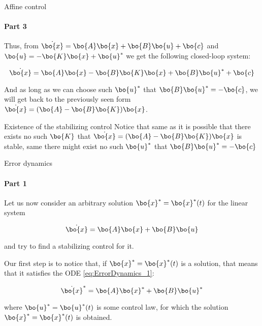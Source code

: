 \documentclass{beamer}
\begin{document}
\begin{frame}{Affine control}
\framesubtitle{Part 3}
\begin{flushleft}

Thus, from $\dot{\bo{x}} = \bo{A}\bo{x} + \bo{B}\bo{u} + \bo{c}$ and $\bo{u} = -\bo{K}\bo{x} + \bo{u}^*$ we get the following closed-loop system:

\begin{equation}
    \dot{\bo{x}} = \bo{A}\bo{x} - \bo{B}\bo{K}\bo{x} + \bo{B}\bo{u}^* + \bo{c}
\end{equation}

And as long as we can choose such $\bo{u}^*$ that $\bo{B}\bo{u}^* = -\bo{c}$, we will get back to the previously seen form $\dot{\bo{x}} = (\bo{A} - \bo{B}\bo{K})\bo{x}$.

\bigskip

\begin{block}{Existence of the stabilizing control}
Notice that same as it is possible that there exists no such $\bo{K}$ that $\dot{\bo{x}} = (\bo{A} - \bo{B}\bo{K})\bo{x}$ is stable, same there might exist no such $\bo{u}^*$ that $\bo{B}\bo{u}^* = -\bo{c}$
\end{block}

\end{flushleft}
\end{frame}



\begin{frame}{Error dynamics}
\framesubtitle{Part 1}
\begin{flushleft}

Let us now consider an arbitrary solution $\bo{x}^* = \bo{x}^*(t)$ for the linear system

\begin{equation}
\label{eq:ErrorDynamics_1}
    \dot{\bo{x}} = \bo{A}\bo{x} + \bo{B}\bo{u}
\end{equation}

and try to find a stabilizing control for it.

\bigskip

Our first step is to notice that, if $\bo{x}^* = \bo{x}^*(t)$ is a solution, that means that it satisfies the ODE \eqref{eq:ErrorDynamics_1}:

\begin{equation}
    \dot{\bo{x}}^* = \bo{A}\bo{x}^* + \bo{B}\bo{u}^*
\end{equation}

where $\bo{u}^* = \bo{u}^*(t)$ is some control law, for which the solution $\bo{x}^* = \bo{x}^*(t)$ is obtained. 

\end{flushleft}
\end{frame}
\end{document}
